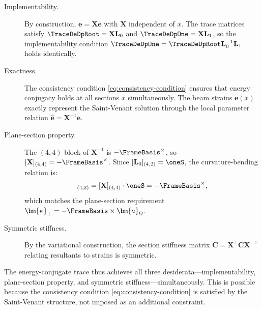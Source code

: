 \begin{description}
\item[Implementability.] 
By construction, $\bm{e} = \mathbf{X}\hat{\bm{e}}$ with $\mathbf{X}$ independent of $x$. 
The trace matrices satisfy $\TraceDeDpRoot = \mathbf{X}\mathbf{L}_0$ and 
$\TraceDeDpOne = \mathbf{X}\mathbf{L}_1$, so the implementability condition 
$\TraceDeDpOne = \TraceDeDpRoot\mathbf{L}_0^{-1}\mathbf{L}_1$ holds identically.

\item[Exactness.] 
The consistency condition \eqref{eq:consistency-condition} ensures that 
energy conjugacy holds at all sections $x$ simultaneously. The beam strains 
$\bm{e}(x)$ exactly represent the Saint-Venant solution through the local 
parameter relation $\hat{\bm{e}} = \mathbf{X}^{-1}\bm{e}$.

\item[Plane-section property.] 
The $(4,4)$ block of $\mathbf{X}^{-1}$ is $-\FrameBasis^\times$, so 
$[\mathbf{X}]_{(4,4)} = -\FrameBasis^\times$. Since 
$[\mathbf{L}_0]_{(4,2)} = \oneS$, the curvature-bending relation is:
\begin{equation}
[\TraceDeDpRoot]_{(4,2)} = [\mathbf{X}]_{(4,4)} \cdot \oneS = -\FrameBasis^\times,
\end{equation}
which matches the plane-section requirement 
$\bm{\kappa}_\perp = -\FrameBasis \times \bm{a}_\Omega$.

\item[Symmetric stiffness.] 
By the variational construction, the section stiffness matrix 
$\mathbf{C} = \mathbf{X}^\top \bar{\mathbf{C}} \mathbf{X}^{-\top}$ relating 
resultants to strains is symmetric.
\end{description}

The energy-conjugate trace thus achieves all three desiderata---implementability, 
plane-section property, and symmetric stiffness---simultaneously. This is 
possible because the consistency condition \eqref{eq:consistency-condition} 
is satisfied by the Saint-Venant structure, not imposed as an additional 
constraint.

